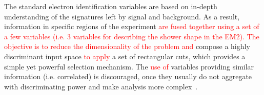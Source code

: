   
The standard electron identification variables are based on in-depth
understanding of the signatures left by signal and background.  As a result, information in specific regions of the experiment
\textcolor{red}{are fused together using a set of a few variables (i.e. 3 variables for describing the shower shape in the EM2). The objective is to reduce the dimensionality of the problem and} compose a highly discriminant input space \textcolor{red}{to apply} a set of rectangular cuts, which provides a simple yet powerful selection mechanism. The \textcolor{red}{use of} variables providing similar information
(i.e. correlated) is discouraged, once they usually do not aggregate with
discriminating power and make analysis more
complex~\cite{aaboud2019electron}.

